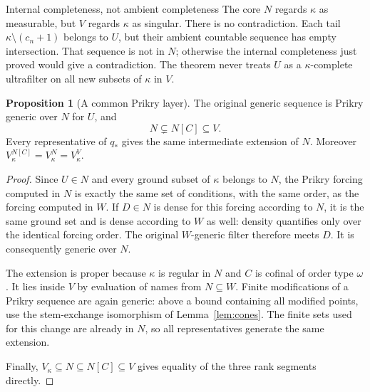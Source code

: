 \documentclass[11pt,letterpaper]{article}
\theoremstyle{definition}
\newtheorem{proposition}[definition]{Proposition}
\numberwithin{equation}{section}
\begin{document}
\begin{assessment}{Internal completeness, not ambient completeness}
The core $N$ regards $\kappa$ as measurable, but $V$ regards $\kappa$ as singular. There is no contradiction. Each tail $\kappa\setminus(c_n+1)$ belongs to $U$, but their ambient countable sequence has empty intersection. That sequence is not in $N$; otherwise the internal completeness just proved would give a contradiction. The theorem never treats $U$ as a $\kappa$-complete ultrafilter on all new subsets of $\kappa$ in $V$.
\end{assessment}

\begin{proposition}[A common Prikry layer]\label{prop:layer}
The original generic sequence is Prikry generic over $N$ for $U$, and
\[
 N\subsetneq N[C]\subseteq V.
\]
Every representative of $q_*$ gives the same intermediate extension of $N$. Moreover $V_\kappa^{N[C]}=V_\kappa^N=V_\kappa^V$.
\end{proposition}
\begin{proof}
Since $U\in N$ and every ground subset of $\kappa$ belongs to $N$, the Prikry forcing computed in $N$ is exactly the same set of conditions, with the same order, as the forcing computed in $W$. If $D\in N$ is dense for this forcing according to $N$, it is the same ground set and is dense according to $W$ as well: density quantifies only over the identical forcing order. The original $W$-generic filter therefore meets $D$. It is consequently generic over $N$.

The extension is proper because $\kappa$ is regular in $N$ and $C$ is cofinal of order type $\omega$. It lies inside $V$ by evaluation of names from $N\subseteq W$. Finite modifications of a Prikry sequence are again generic: above a bound containing all modified points, use the stem-exchange isomorphism of Lemma~\ref{lem:cones}. The finite sets used for this change are already in $N$, so all representatives generate the same extension.

Finally, $V_\kappa\subseteq N\subseteq N[C]\subseteq V$ gives equality of the three rank segments directly.
\end{proof}
\end{document}
